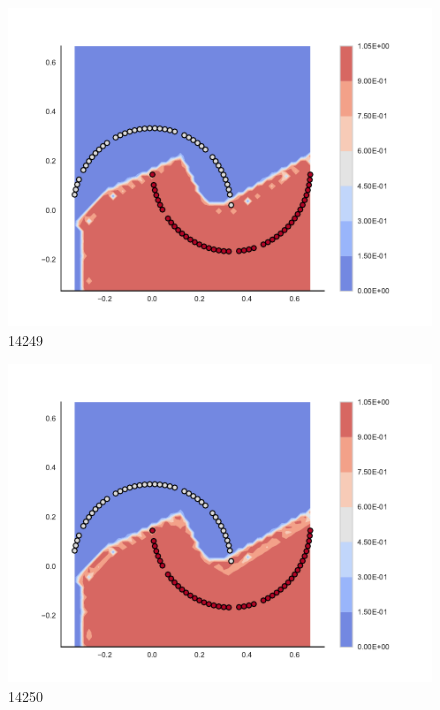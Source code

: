 \begin{subfigure}[b]{0.09\textwidth}
    \includegraphics[clip, trim=2.35cm 1.75cm 4.5cm 0cm,width=\textwidth]{img/convergence/14249.pdf}
    \caption{14249}
    \label{fig:convergence_14249}
\end{subfigure}
%
\begin{subfigure}[b]{0.09\textwidth}
    \includegraphics[clip, trim=2.35cm 1.75cm 4.5cm 0cm,width=\textwidth]{img/convergence/14250.pdf}
    \caption{14250}
    \label{fig:convergence_14250}
\end{subfigure}
%
